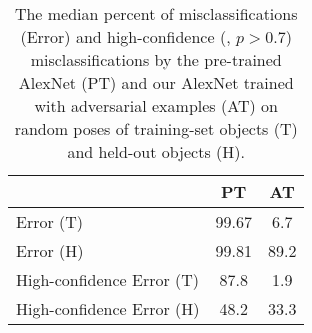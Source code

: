 \documentclass[10pt,twocolumn,letterpaper]{article}
\begin{document}


%

\begin{table}[h]
\begin{center}
  \begin{tabular}{lcc}
    \toprule
     & PT & AT \\
    \midrule
    Error (T) & 99.67 & 6.7 \\
    Error (H) & 99.81 & 89.2 \\
    \midrule
    High-confidence Error (T) & 87.8 & 1.9 \\        High-confidence Error (H) & 48.2 & 33.3 \\
    \bottomrule
\end{tabular}
\end{center}
\caption{The median percent of misclassifications (Error) and high-confidence (\ie, $p > 0.7$) misclassifications by the pre-trained AlexNet (PT) and our AlexNet trained with adversarial examples (AT) on random poses of training-set objects (T) and held-out objects (H).}
\label{tab:ax_stats}
\end{table}
\end{document}
